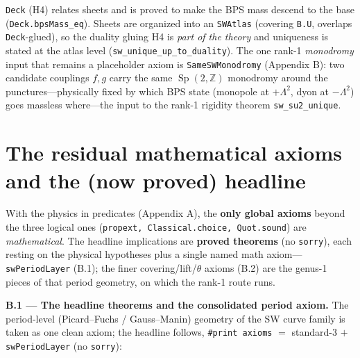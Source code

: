 \documentclass[11pt]{article}
\newcommand{\Z}{\mathbb{Z}}
\newcommand{\Sp}{\operatorname{Sp}}
\newcommand{\code}[1]{\texttt{#1}}
\begin{document}
\noindent \code{Deck} (H4) relates sheets and is proved to make the BPS mass descend to the
base (\code{Deck.bpsMass\_eq}). Sheets are organized into an \code{SWAtlas} (covering \code{B.U},
overlaps \code{Deck}-glued), so the duality gluing H4 is \emph{part of the theory} and uniqueness
is stated at the atlas level (\code{sw\_unique\_up\_to\_duality}). The one rank-1
\emph{monodromy} input that remains a placeholder
axiom is \code{SameSWMonodromy} (Appendix B): two candidate couplings $f,g$ carry the same
$\Sp(2,\Z)$ monodromy around the punctures---physically fixed by which BPS state (monopole at
$+\Lambda^2$, dyon at $-\Lambda^2$) goes massless where---the input to the rank-1 rigidity
theorem \code{sw\_su2\_unique}.

\section{The residual mathematical axioms and the (now proved) headline}

With the physics in predicates (Appendix A), the \textbf{only global axioms} beyond the three
logical ones (\code{propext, Classical.choice, Quot.sound}) are \emph{mathematical}. The headline
implications are \textbf{proved theorems} (no \code{sorry}), each resting on the physical hypotheses
plus a single named math axiom---\code{swPeriodLayer} (B.1); the finer covering/lift/$\theta$ axioms
(B.2) are the genus-1 pieces of that period geometry, on which the rank-1 route runs.

\medskip
\noindent\textbf{B.1 --- The headline theorems and the consolidated period axiom.} The period-level
(Picard--Fuchs / Gauss--Manin) geometry of the SW curve family is taken as one clean axiom; the
headline follows, \code{\#print axioms} $=$ standard-3 $+$ \code{swPeriodLayer} (no \code{sorry}):
\end{document}
